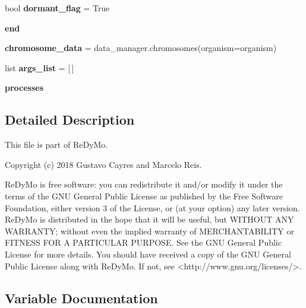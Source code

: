 \begin{DoxyCompactItemize}
\mbox{\label{namespacesrc_1_1main_a2e4850a579504b3001fe3125a9c9705a}} 
bool {\bfseries dormant\+\_\+flag} = True
\item 
\mbox{\label{namespacesrc_1_1main_a1b8ad1f617a3e804f6dc9e38044adc4b}} 
{\bfseries end}
\item 
\mbox{\label{namespacesrc_1_1main_a3253b9b7a5258dfec715730d282495af}} 
{\bfseries chromosome\+\_\+data} = data\+\_\+manager.\+chromosomes(organism=organism)
\item 
\mbox{\label{namespacesrc_1_1main_a38f60d8268ea1f907280e19d5b318c70}} 
list {\bfseries args\+\_\+list} = \mbox{[}$\,$\mbox{]}
\item 
\mbox{\label{namespacesrc_1_1main_a2f6b63e92b8b2856c439c5775d0bed83}} 
{\bfseries processes}
\end{DoxyCompactItemize}


\subsection{Detailed Description}
\begin{DoxyVerb}This file is part of ReDyMo.

Copyright (c) 2018  Gustavo Cayres and Marcelo Reis.

ReDyMo is free software: you can redistribute it and/or modify it
under the terms of the GNU General Public License as published by the
Free Software Foundation, either version 3 of the License, or (at your
option) any later version.
ReDyMo is distributed in the hope that it will be useful, but WITHOUT
ANY WARRANTY; without even the implied warranty of MERCHANTABILITY or
FITNESS FOR A PARTICULAR PURPOSE. See the GNU General Public License
for more details.
You should have received a copy of the GNU General Public License along
with ReDyMo. If not, see <http://www.gnu.org/licenses/>.
\end{DoxyVerb}
 

\subsection{Variable Documentation}
\mbox{\label{namespacesrc_1_1main_a3f8136ff3533e538e524a1d27d4c46d2}} 
